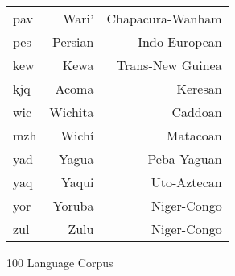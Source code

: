 {\begin{longtable}{lrr}
pav                & Wari'                     & Chapacura-Wanham     \\
pes                & Persian                   & Indo-European        \\
kew                & Kewa                      & Trans-New Guinea     \\
kjq                & Acoma                     & Keresan              \\
wic                & Wichita                   & Caddoan              \\
mzh                & Wichí                     & Matacoan             \\
yad                & Yagua                     & Peba-Yaguan          \\
yaq                & Yaqui                     & Uto-Aztecan          \\
yor                & Yoruba                    & Niger-Congo          \\
zul                & Zulu                      & Niger-Congo          \\
\end{longtable}
}{100 Language Corpus}
